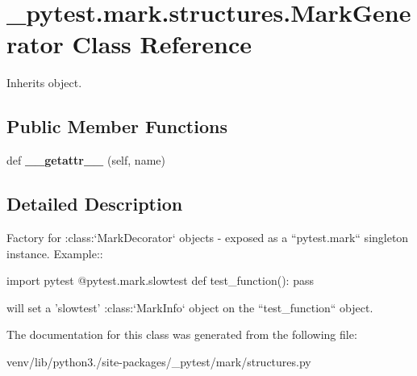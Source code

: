 \hypertarget{class__pytest_1_1mark_1_1structures_1_1_mark_generator}{}\section{\+\_\+pytest.\+mark.\+structures.\+Mark\+Generator Class Reference}
\label{class__pytest_1_1mark_1_1structures_1_1_mark_generator}


Inherits object.

\subsection*{Public Member Functions}
\begin{DoxyCompactItemize}
\item 
\mbox{\label{class__pytest_1_1mark_1_1structures_1_1_mark_generator_a46353f964cdb5ce801eed99581d1b129}} 
def {\bfseries \+\_\+\+\_\+getattr\+\_\+\+\_\+} (self, name)
\end{DoxyCompactItemize}


\subsection{Detailed Description}
\begin{DoxyVerb}Factory for :class:`MarkDecorator` objects - exposed as
a ``pytest.mark`` singleton instance.  Example::

     import pytest
     @pytest.mark.slowtest
     def test_function():
        pass

will set a 'slowtest' :class:`MarkInfo` object
on the ``test_function`` object. \end{DoxyVerb}
 

The documentation for this class was generated from the following file\+:\begin{DoxyCompactItemize}
\item 
venv/lib/python3./site-\/packages/\+\_\+pytest/mark/structures.\+py\end{DoxyCompactItemize}
